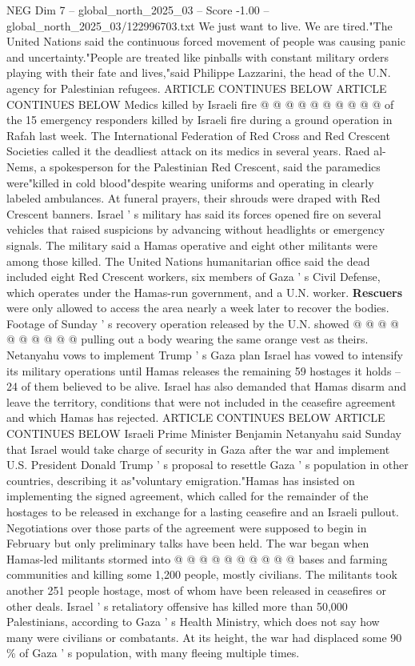 \begin{textsample}{NEG Dim 7 – global\_north\_2025\_03 – Score -1.00 – global\_north\_2025\_03/122996703.txt}
We just want to live.
We are tired."The United Nations said the continuous forced movement of people was causing panic and uncertainty."People are treated like pinballs with constant military orders playing with their fate and lives,"said Philippe Lazzarini, the head of the U.N. agency for Palestinian refugees.
ARTICLE CONTINUES BELOW ARTICLE CONTINUES BELOW Medics killed by Israeli fire @ @ @ @ @ @ @ @ @ @ of the 15 emergency responders killed by Israeli fire during a ground operation in Rafah last week.
The International Federation of Red Cross and Red Crescent Societies called it the deadliest attack on its medics in several years.
Raed al-Nems, a spokesperson for the Palestinian Red Crescent, said the paramedics were"killed in cold blood"despite wearing uniforms and operating in clearly labeled ambulances.
At funeral prayers, their shrouds were draped with Red Crescent banners.
Israel ' s military has said its forces opened fire on several vehicles that raised suspicions by advancing without headlights or emergency signals.
The military said a Hamas operative and eight other militants were among those killed.
The United Nations humanitarian office said the dead included eight Red Crescent workers, six members of Gaza ' s Civil Defense, which operates under the Hamas-run government, and a U.N. worker. \textbf{Rescuers} were only allowed to access the area nearly a week later to recover the bodies.
Footage of Sunday ' s recovery operation released by the U.N. showed @ @ @ @ @ @ @ @ @ @ pulling out a body wearing the same orange vest as theirs.
Netanyahu vows to implement Trump ' s Gaza plan Israel has vowed to intensify its military operations until Hamas releases the remaining 59 hostages it holds -- 24 of them believed to be alive.
Israel has also demanded that Hamas disarm and leave the territory, conditions that were not included in the ceasefire agreement and which Hamas has rejected.
ARTICLE CONTINUES BELOW ARTICLE CONTINUES BELOW Israeli Prime Minister Benjamin Netanyahu said Sunday that Israel would take charge of security in Gaza after the war and implement U.S.
President Donald Trump ' s proposal to resettle Gaza ' s population in other countries, describing it as"voluntary emigration."Hamas has insisted on implementing the signed agreement, which called for the remainder of the hostages to be released in exchange for a lasting ceasefire and an Israeli pullout.
Negotiations over those parts of the agreement were supposed to begin in February but only preliminary talks have been held.
The war began when Hamas-led militants stormed into @ @ @ @ @ @ @ @ @ @ bases and farming communities and killing some 1,200 people, mostly civilians.
The militants took another 251 people hostage, most of whom have been released in ceasefires or other deals.
Israel ' s retaliatory offensive has killed more than 50,000 Palestinians, according to Gaza ' s Health Ministry, which does not say how many were civilians or combatants.
At its height, the war had displaced some 90 \% of Gaza ' s population, with many fleeing multiple times.

\end{textsample}
